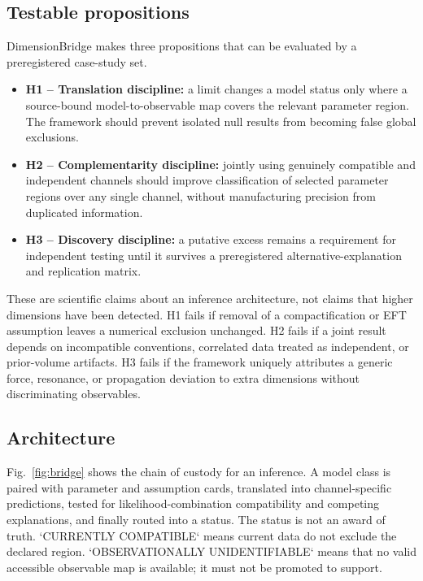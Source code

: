\documentclass[conference]{IEEEtran}
\begin{document}
\subsection{Testable propositions}

DimensionBridge makes three propositions that can be evaluated by a preregistered case-study set.

\begin{itemize}[leftmargin=*,nosep]
\item \textbf{H1 -- Translation discipline:} a limit changes a model status only where a source-bound model-to-observable map covers the relevant parameter region. The framework should prevent isolated null results from becoming false global exclusions.
\item \textbf{H2 -- Complementarity discipline:} jointly using genuinely compatible and independent channels should improve classification of selected parameter regions over any single channel, without manufacturing precision from duplicated information.
\item \textbf{H3 -- Discovery discipline:} a putative excess remains a requirement for independent testing until it survives a preregistered alternative-explanation and replication matrix.
\end{itemize}

These are scientific claims about an inference architecture, not claims that higher dimensions have been detected. H1 fails if removal of a compactification or EFT assumption leaves a numerical exclusion unchanged. H2 fails if a joint result depends on incompatible conventions, correlated data treated as independent, or prior-volume artifacts. H3 fails if the framework uniquely attributes a generic force, resonance, or propagation deviation to extra dimensions without discriminating observables.

\subsection{Architecture}

Fig.~\ref{fig:bridge} shows the chain of custody for an inference. A model class is paired with parameter and assumption cards, translated into channel-specific predictions, tested for likelihood-combination compatibility and competing explanations, and finally routed into a status. The status is not an award of truth. `CURRENTLY COMPATIBLE` means current data do not exclude the declared region. `OBSERVATIONALLY UNIDENTIFIABLE` means that no valid accessible observable map is available; it must not be promoted to support.
\end{document}
